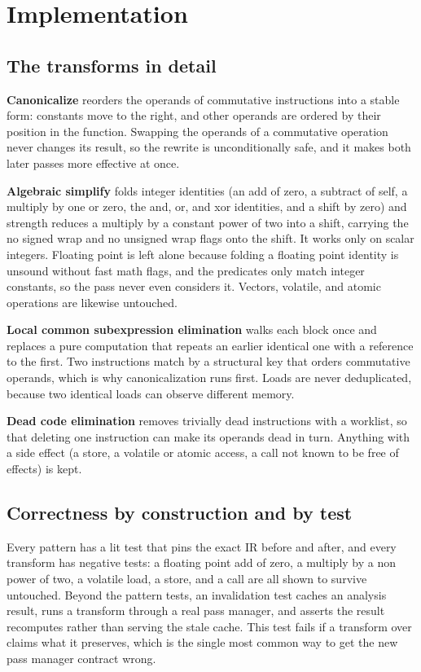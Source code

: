 \section{Implementation}

\subsection{The transforms in detail}

\textbf{Canonicalize} reorders the operands of commutative instructions into a
stable form: constants move to the right, and other operands are ordered by their
position in the function. Swapping the operands of a commutative operation never
changes its result, so the rewrite is unconditionally safe, and it makes both
later passes more effective at once.

\textbf{Algebraic simplify} folds integer identities (an add of zero, a subtract
of self, a multiply by one or zero, the and, or, and xor identities, and a shift
by zero) and strength reduces a multiply by a constant power of two into a shift,
carrying the no signed wrap and no unsigned wrap flags onto the shift. It works
only on scalar integers. Floating point is left alone because folding a floating
point identity is unsound without fast math flags, and the predicates only match
integer constants, so the pass never even considers it. Vectors, volatile, and
atomic operations are likewise untouched.

\textbf{Local common subexpression elimination} walks each block once and
replaces a pure computation that repeats an earlier identical one with a
reference to the first. Two instructions match by a structural key that orders
commutative operands, which is why canonicalization runs first. Loads are never
deduplicated, because two identical loads can observe different memory.

\textbf{Dead code elimination} removes trivially dead instructions with a
worklist, so that deleting one instruction can make its operands dead in turn.
Anything with a side effect (a store, a volatile or atomic access, a call not
known to be free of effects) is kept.

\subsection{Correctness by construction and by test}

Every pattern has a lit test that pins the exact IR before and after, and every
transform has negative tests: a floating point add of zero, a multiply by a non
power of two, a volatile load, a store, and a call are all shown to survive
untouched. Beyond the pattern tests, an invalidation test caches an analysis
result, runs a transform through a real pass manager, and asserts the result
recomputes rather than serving the stale cache. This test fails if a transform
over claims what it preserves, which is the single most common way to get the new
pass manager contract wrong.
